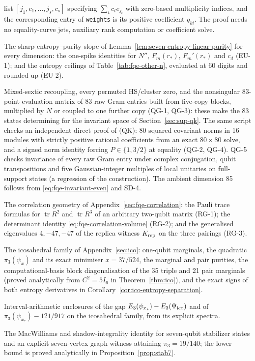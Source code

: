 \begin{description}
list $[j_1,c_1,\ldots,j_s,c_s]$ specifying $\sum_tc_te_{j_t}$ with zero-based multiplicity indices,
and the corresponding entry of \texttt{weights} is its positive coefficient $q_{ki}$.
The proof needs no equality-curve jets, auxiliary rank computation or coefficient solve.
\item[EU-1, EU-2] The sharp entropy--purity slope of Lemma~\ref{lem:seven-entropy-linear-purity} for
every dimension: the one-spike identities for $N''$, $F_m(r_*)$, $F_m'(r_*)$ and $c_d$ (EU-1); and the entropy ceilings
of Table~\ref{tab:fqe-other-n}, evaluated at 60 digits and rounded up (EU-2).
\item[QG-1--QG-5] Mixed-sextic recoupling, every permuted HS/cluster zero, and the nonsingular 83-point evaluation matrix of
83 raw Gram entries built from five-copy blocks, multiplied by $N$ or coupled to one further copy (QG-1, QG-3):
these make the 83 states determining for the invariant space of
Section~\ref{sec:sup-qk}. The same script checks an independent direct proof of (QK): 80 squared covariant norms in 16
modules with strictly positive rational coefficients from an exact $80\times80$ solve, and a signed norm identity forcing
$P\in\{1,3/2\}$ at equality (QG-2, QG-4). QG-5 checks invariance of every raw Gram entry under complex conjugation, qubit
transpositions and five Gaussian-integer multiples of local unitaries on full-support states (a regression of the
construction). The ambient dimension 85 follows from \eqref{eq:fqe-invariant-even} and SD-4.

\item[RG-1--RG-3] The correlation geometry of Appendix~\ref{sec:fqe-correlation}: the Pauli trace formulas
for $\operatorname{tr}R^2$ and $\operatorname{tr}R^3$ of an arbitrary two-qubit matrix (RG-1); the determinant
identity \eqref{eq:fqe-correlation-volume} (RG-2); and the generalised eigenvalues $4,-47,-47$ of the
replica witness $K_{\rm rep}$ on the three pairings (RG-3).
\item[IC-1--IC-6] The icosahedral family of Appendix~\ref{sec:ico}: one-qubit marginals, the
quadratic $\pi_3(\psi_x)$ and its exact minimiser $x=37/524$, the marginal and pair purities, the
computational-basis block diagonalisation of the 35 triple and 21 pair marginals (proved analytically from $C^2=5I_6$ in Theorem~\ref{thm:ico}),
and the exact signs of both entropy derivatives in Corollary~\ref{cor:ico-entropy-separation}.
\item[EG-1] Interval-arithmetic enclosures of the gap $E_3(\psi_{x_*})-E_3(\Psi_{\mathrm{ico}})$ and of $\pi_3(\psi_{x_*})-121/917$ on
the icosahedral family, from its explicit spectra.
\item[GS-4] The MacWilliams and shadow-integrality identity for seven-qubit stabilizer states and an explicit seven-vertex graph witness attaining $\pi_3=19/140$; the lower bound is proved analytically in Proposition~\ref{prop:stab7}.


\end{description}
